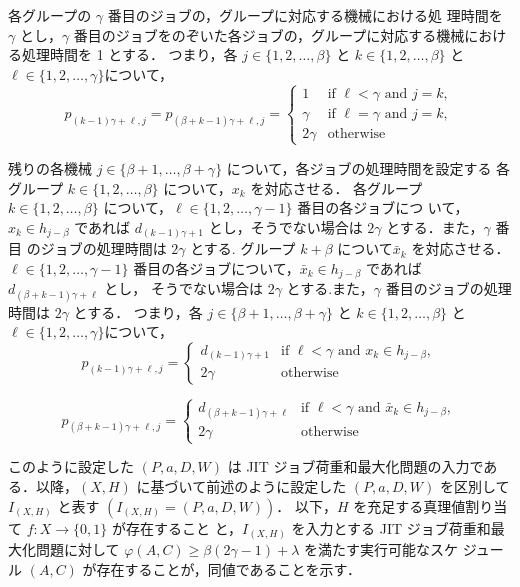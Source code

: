 \documentclass[12pt]{optlab-bachelor}
\begin{document}
\begin{description}
  各グループの $\gamma$ 番目のジョブの，グループに対応する機械における処
  理時間を $\gamma$ とし，$\gamma$ 番目のジョブをのぞいた各ジョブの，グループに対応する機械における処理時間を 1 とする．
  つまり，各 $j \in \{1,2,\ldots, \beta\}$ と $k \in \{1,2,\ldots,
  \beta\}$ と $\ell \in \{1,2,\ldots, \gamma\}$について，
  $$p_{(k - 1)\gamma + \ell, j} = p_{(\beta + k - 1)\gamma + \ell, j} = \left\{ \begin{array}{ll} 1 & \text{if } \ell < \gamma \text{ and } j = k, \\ \gamma & \text{if } \ell = \gamma \text{ and } j = k, \\ 2\gamma & \text{otherwise}\end{array} \right.$$

  残りの各機械 $j \in \{\beta + 1, \ldots , \beta + \gamma\}$ について，各ジョブの処理時間を設定する
  各グループ $k \in \{1,2,\ldots,\beta\}$ について，$x_k$ を対応させる．
  各グループ $k \in \{1,2,\ldots,\beta\}$ について，$\ell \in \{1,2,\ldots, \gamma - 1\}$ 番目の各ジョブにつ いて，$x_k \in h_{j - \beta}$ であれば $d_{(k - 1)\gamma + 1}$ とし，そうでない場合は $2\gamma$ とする．また，$\gamma$ 番目 のジョブの処理時間は $2\gamma$ とする.
  グループ $k + \beta$ について$\bar x_k$ を対応させる．
  $\ell \in \{1,2,\ldots, \gamma - 1\}$ 番目の各ジョブについて，$\bar x_k \in h_{j - \beta}$ であれば $d_{(\beta + k - 1)\gamma + \ell}$ とし， そうでない場合は $2\gamma$ とする.また，$\gamma$ 番目のジョブの処理時間は $2\gamma$ とする．
  つまり，各 $j \in \{\beta + 1,\ldots, \beta + \gamma\}$ と $k \in
  \{1,2,\ldots, \beta\}$ と $\ell \in \{1,2,\ldots, \gamma\}$について，
  $$p_{(k - 1)\gamma + \ell, j} = \left\{ \begin{array}{ll} d_{(k - 1)\gamma + 1} & \text{if } \ell < \gamma \text{ and } x_k \in h_{j - \beta}, \\ 2\gamma & \text{otherwise} \end{array} \right.$$

  $$p_{(\beta + k - 1)\gamma + \ell, j} = \left\{ \begin{array}{ll} d_{(\beta + k - 1)\gamma + \ell} & \text{if } \ell < \gamma \text{ and } \bar x_k \in h_{j - \beta}, \\ 2\gamma & \text{otherwise} \end{array} \right.$$
\end{description}

このように設定した $(P,a,D,W)$ は JIT ジョブ荷重和最大化問題の入力である．以降，$(X,H)$ に基づいて前述のように設定した $(P,a,D,W)$ を区別して $I_{(X,H)}$ と表す $(I_{(X,H)} = (P,a,D,W))$．
以下，$H$ を充足する真理値割り当て $f : X \to \{0,1\}$ が存在すること
と，$I_{(X,H)}$ を入力とする JIT ジョブ荷重和最大化問題に対して
$\varphi(A,C) \ge \beta(2\gamma - 1) + \lambda$ を満たす実行可能なスケ
ジュール $(A,C)$ が存在することが，同値であることを示す．
\end{document}
